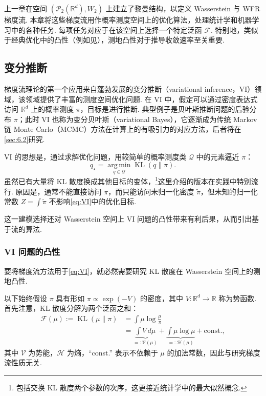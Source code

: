 上一章在空间 $(\mathcal P_2(\mathbb R^d),W_2)$ 上建立了黎曼结构，以定义 Wasserstein 与 WFR 梯度流. 本章将这些梯度流用作概率测度空间上的优化算法，处理统计学和机器学习中的各种任务. 每项任务对应于在该空间上选择一个特定泛函 $\mathcal F$. 特别地，类似于经典优化中的凸性（例如见\cite{ref56}），测地凸性对于推导收敛速率至关重要.

\subsection{变分推断}\label{sec:6.1}

梯度流理论的第一个应用来自蓬勃发展的变分推断（variational inference，VI）领域\cite{ref40,ref171,ref319}，该领域提供了丰富的测度空间优化问题. 在 VI 中，假定可以通过密度表达式访问 $\mathbb R^d$ 上的概率测度 $\pi$，目标是进行推断. 典型例子是贝叶斯推断问题的后验分布 $\pi$；此时 VI 也称为变分贝叶斯（variational Bayes），它逐渐成为传统 Markov 链 Monte Carlo（MCMC）方法在计算上的有吸引力的对应方法，后者将在\autoref{sec:6.2}研究.

VI 的思想是，通过求解优化问题，用较简单的概率测度类 $\mathcal Q$ 中的元素逼近 $\pi$：
\begin{equation}\tag{VI}\label{eq:VI}
q_\star=\operatorname*{arg\,min}_{q\in\mathcal Q}\operatorname{KL}(q\|\pi).
\end{equation}
虽然已有大量将 KL 散度换成其他目标的变体，\footnote{包括交换 KL 散度两个参数的次序，这更接近统计学中的最大似然概念.}这里介绍的版本在实践中特别流行. 原因是，通常不能直接访问 $\pi$，而只能访问未归一化密度 $\widetilde\pi$，但未知的归一化常数 $Z=\int\widetilde\pi$ 不影响\eqref{eq:VI}中的优化目标.

这一建模选择还对 Wasserstein 空间上 VI 问题的凸性带来有利后果，从而引出基于流的算法.

\subsubsection{VI 问题的凸性}\label{sec:6.1.1}

要将梯度流方法用于\eqref{eq:VI}，就必然需要研究 KL 散度在 Wasserstein 空间上的测地凸性.

以下始终假设 $\pi$ 具有形如 $\pi\propto\exp(-V)$ 的密度，其中 $V:\mathbb R^d\to\mathbb R$ 称为势函数. 首先注意，KL 散度分解为两个泛函之和：
\begin{equation}\label{eq:6.1}
\begin{aligned}
\mathcal F(\mu):=\operatorname{KL}(\mu\|\pi)
&=\int\mu\log\frac\mu\pi\\
&=\underbrace{\int V\,d\mu}_{=:\mathcal V(\mu)}
+\underbrace{\int\mu\log\mu}_{=:\mathcal H(\mu)}+\mathrm{const.},
\end{aligned}
\end{equation}
其中 $\mathcal V$ 为势能，$\mathcal H$ 为熵，“const.” 表示不依赖于 $\mu$ 的加法常数，因此与研究梯度流性质无关.

